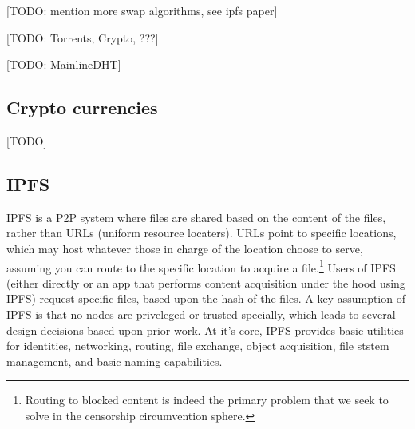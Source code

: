 \documentclass[12pt]{report}
\begin{document}
[TODO: mention more swap algorithms, see ipfs paper]

[TODO: Torrents, Crypto, ???]

[TODO: MainlineDHT]

\subsection{Crypto currencies}

[TODO]

\subsection{IPFS}

IPFS is a P2P system where files are shared based on the content of the files, rather than URLs (uniform resource locaters). URLs point to specific locations, which may host whatever those in charge of the location choose to serve, assuming you can route to the specific location to acquire a file.\footnote{Routing to blocked content is indeed the primary problem that we seek to solve in the censorship circumvention sphere.} Users of IPFS (either directly or an app that performs content acquisition under the hood using IPFS) request specific files, based upon the hash of the files. A key assumption of IPFS is that no nodes are priveleged or trusted specially, which leads to several design decisions based upon prior work. At it's core, IPFS provides basic utilities for identities, networking, routing, file exchange, object acquisition, file ststem management, and basic naming capabilities.\cite{ipfs}
\end{document}

